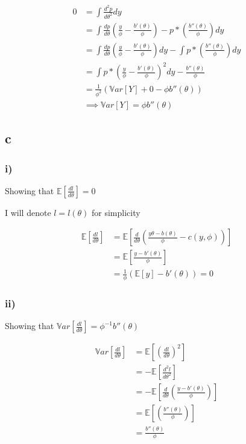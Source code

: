 \documentclass[]{article}
\begin{document}
\[
\begin{aligned}
0 &= \int \frac{d^2p}{d\theta^2} dy \\
&= \int \frac{dp}{d\theta} \left( \frac{y}{\phi} - \frac{b'(\theta)}{\phi} \right) - p * \left(  \frac{b''(\theta)}{\phi} \right) dy \\
&= \int \frac{dp}{d\theta} \left( \frac{y}{\phi} - \frac{b'(\theta)}{\phi} \right) dy - \int p * \left(  \frac{b''(\theta)}{\phi} \right) dy \\
&= \int p * \left( \frac{y}{\phi} - \frac{b'(\theta)}{\phi} \right)^2 dy - \frac{b''(\theta)}{\phi}  \\ 
&= \frac{1}{\phi^2} \left( \mathbb{V}ar[Y] + 0  - \phi b''(\theta) \right) \\
&\implies \mathbb{V}ar[Y] = \phi b''(\theta)
\end{aligned}
\]

\hypertarget{c}{%
\subsection{c}\label{c}}

\hypertarget{i-2}{%
\subsubsection{i)}\label{i-2}}

Showing that \(\mathbb{E}[\frac{dl}{d\theta}] = 0\)

I will denote \(l = l(\theta)\) for simplicity

\[
\begin{aligned}
\mathbb{E}[\frac{dl}{d\theta}] &= \mathbb{E}\left[ \frac{d}{d\theta} \left( \frac{y \theta - b(\theta)}{\phi} - c(y, \phi) \right)\right] \\
&= \mathbb{E}\left[ \frac{y - b'(\theta)}{\phi} \right] \\
&= \frac{1}{\phi} (\mathbb{E}\left[ y \right]- b'(\theta) ) = 0
\end{aligned}
\]

\hypertarget{ii-2}{%
\subsubsection{ii)}\label{ii-2}}

Showing that
\(\mathbb{V}ar[\frac{dl}{d\theta}] = \phi^{-1} b''(\theta)\)

\[
\begin{aligned}
\mathbb{V}ar \left[ \frac{dl}{d\theta} \right] &= \mathbb{E}\left[ \left( \frac{dl}{d\theta} \right)^2 \right] \\
&= - \mathbb{E} \left[ \frac{d^2l}{d\theta^2} \right] \\
&= - \mathbb{E} \left[ \frac{d}{d\theta} \left( \frac{y - b'(\theta)}{\phi} \right) \right] \\
&=  \mathbb{E} \left[ \left( \frac{b''(\theta)}{\phi} \right) \right] \\
&=  \frac{b''(\theta)}{\phi}
\end{aligned}
\]
\end{document}
